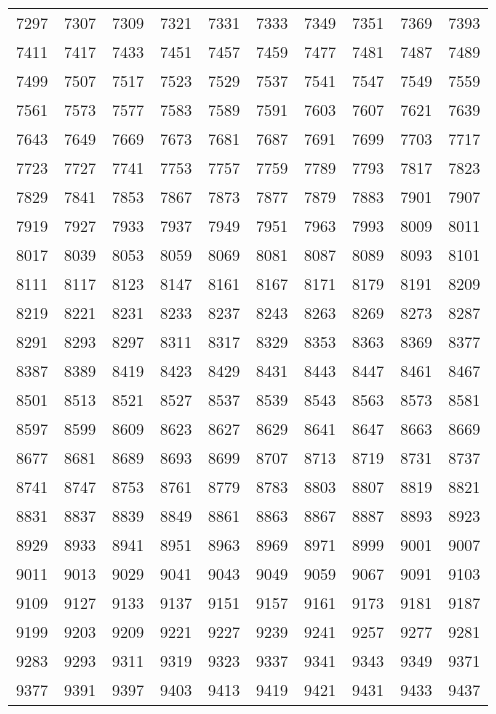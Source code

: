 \begin{longtable}{llllllllll}
7297	&	7307	&	7309	&	7321	&	7331	&	7333	&	7349	&	7351	&	7369	&	7393	\\
7411	&	7417	&	7433	&	7451	&	7457	&	7459	&	7477	&	7481	&	7487	&	7489	\\
7499	&	7507	&	7517	&	7523	&	7529	&	7537	&	7541	&	7547	&	7549	&	7559	\\
7561	&	7573	&	7577	&	7583	&	7589	&	7591	&	7603	&	7607	&	7621	&	7639	\\
7643	&	7649	&	7669	&	7673	&	7681	&	7687	&	7691	&	7699	&	7703	&	7717	\\
7723	&	7727	&	7741	&	7753	&	7757	&	7759	&	7789	&	7793	&	7817	&	7823	\\
7829	&	7841	&	7853	&	7867	&	7873	&	7877	&	7879	&	7883	&	7901	&	7907	\\
7919	&	7927	&	7933	&	7937	&	7949	&	7951	&	7963	&	7993	&	8009	&	8011	\\
8017	&	8039	&	8053	&	8059	&	8069	&	8081	&	8087	&	8089	&	8093	&	8101	\\
8111	&	8117	&	8123	&	8147	&	8161	&	8167	&	8171	&	8179	&	8191	&	8209	\\
8219	&	8221	&	8231	&	8233	&	8237	&	8243	&	8263	&	8269	&	8273	&	8287	\\
8291	&	8293	&	8297	&	8311	&	8317	&	8329	&	8353	&	8363	&	8369	&	8377	\\
8387	&	8389	&	8419	&	8423	&	8429	&	8431	&	8443	&	8447	&	8461	&	8467	\\
8501	&	8513	&	8521	&	8527	&	8537	&	8539	&	8543	&	8563	&	8573	&	8581	\\
8597	&	8599	&	8609	&	8623	&	8627	&	8629	&	8641	&	8647	&	8663	&	8669	\\
8677	&	8681	&	8689	&	8693	&	8699	&	8707	&	8713	&	8719	&	8731	&	8737	\\
8741	&	8747	&	8753	&	8761	&	8779	&	8783	&	8803	&	8807	&	8819	&	8821	\\
8831	&	8837	&	8839	&	8849	&	8861	&	8863	&	8867	&	8887	&	8893	&	8923	\\
8929	&	8933	&	8941	&	8951	&	8963	&	8969	&	8971	&	8999	&	9001	&	9007	\\
9011	&	9013	&	9029	&	9041	&	9043	&	9049	&	9059	&	9067	&	9091	&	9103	\\
9109	&	9127	&	9133	&	9137	&	9151	&	9157	&	9161	&	9173	&	9181	&	9187	\\
9199	&	9203	&	9209	&	9221	&	9227	&	9239	&	9241	&	9257	&	9277	&	9281	\\
9283	&	9293	&	9311	&	9319	&	9323	&	9337	&	9341	&	9343	&	9349	&	9371	\\
9377	&	9391	&	9397	&	9403	&	9413	&	9419	&	9421	&	9431	&	9433	&	9437	\\

\end{longtable}
